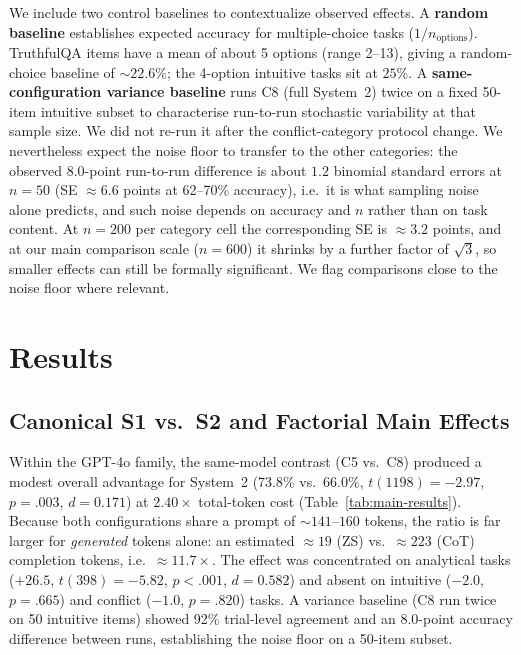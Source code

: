 \documentclass[conference]{IEEEtran}
\begin{document}
We include two control baselines to contextualize observed effects. A \textbf{random baseline} establishes expected accuracy for multiple-choice tasks ($1/n_{\text{options}}$). TruthfulQA items have a mean of about 5 options (range 2--13), giving a random-choice baseline of ${\sim}22.6\%$; the 4-option intuitive tasks sit at $25\%$. A \textbf{same-configuration variance baseline} runs C8 (full System~2) twice on a fixed 50-item intuitive subset to characterise run-to-run stochastic variability at that sample size. We did not re-run it after the conflict-category protocol change. We nevertheless expect the noise floor to transfer to the other categories: the observed 8.0-point run-to-run difference is about $1.2$ binomial standard errors at $n = 50$ (SE $\approx 6.6$ points at 62--70\% accuracy), i.e.\ it is what sampling noise alone predicts, and such noise depends on accuracy and $n$ rather than on task content. At $n = 200$ per category cell the corresponding SE is ${\approx}3.2$ points, and at our main comparison scale ($n = 600$) it shrinks by a further factor of $\sqrt{3}$, so smaller effects can still be formally significant. We flag comparisons close to the noise floor where relevant.

\section{Results}
\label{sec:results}

\subsection{Canonical S1 vs.\ S2 and Factorial Main Effects}
\label{sec:factorial-results}

Within the GPT-4o family, the same-model contrast (C5 vs.\ C8) produced a modest overall advantage for System~2 (73.8\% vs.\ 66.0\%, $t(1198) = -2.97$, $p = .003$, $d = 0.171$) at $2.40\times$ total-token cost (Table~\ref{tab:main-results}). Because both configurations share a prompt of ${\sim}141$--$160$ tokens, the ratio is far larger for \textit{generated} tokens alone: an estimated ${\approx}19$ (ZS) vs.\ ${\approx}223$ (CoT) completion tokens, i.e.\ ${\approx}11.7\times$. The effect was concentrated on analytical tasks ($+26.5$, $t(398) = -5.82$, $p < .001$, $d = 0.582$) and absent on intuitive ($-2.0$, $p = .665$) and conflict ($-1.0$, $p = .820$) tasks. A variance baseline (C8 run twice on 50 intuitive items) showed 92\% trial-level agreement and an 8.0-point accuracy difference between runs, establishing the noise floor on a 50-item subset.
\end{document}
